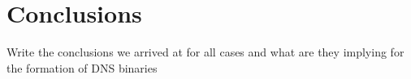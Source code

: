 \documentclass[../../main/thesis_msc.tex]{subfiles}
\begin{document}
	\chapter{Conclusions}
	
		Write the conclusions we arrived at for all cases and what are they implying for the formation of DNS binaries
\end{document}
